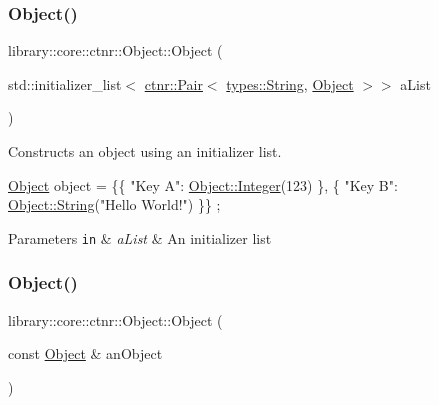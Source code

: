 \subsubsection{\texorpdfstring{Object()}{Object()}\hspace{0.1cm}{\footnotesize\ttfamily [2/3]}}
{\footnotesize\ttfamily library\+::core\+::ctnr\+::\+Object\+::\+Object (\begin{DoxyParamCaption}\item[{std\+::initializer\+\_\+list$<$ \hyperlink{namespacelibrary_1_1core_1_1ctnr_aad6f8de4c0f279c10436d59d4ace74bd}{ctnr\+::\+Pair}$<$ \hyperlink{classlibrary_1_1core_1_1types_1_1_string}{types\+::\+String}, \hyperlink{classlibrary_1_1core_1_1ctnr_1_1_object}{Object} $>$$>$}]{a\+List }\end{DoxyParamCaption})}



Constructs an object using an initializer list. 


\begin{DoxyCode}
\hyperlink{classlibrary_1_1core_1_1ctnr_1_1_object_a51bb72dec3a1b2738e0ad92b977b8d8d}{Object} \textcolor{keywordtype}{object} = \{\{ \textcolor{stringliteral}{"Key A"}: \hyperlink{classlibrary_1_1core_1_1ctnr_1_1_object_a8a8b1ef718d092c154011cf5c37373bb}{Object::Integer}(123) \}, \{ \textcolor{stringliteral}{"Key B"}: 
      \hyperlink{classlibrary_1_1core_1_1ctnr_1_1_object_a4f6eb8f93e1907ac91b6055c456f9ec3}{Object::String}(\textcolor{stringliteral}{"Hello World!"}) \}\} ;
\end{DoxyCode}



\begin{DoxyParams}[1]{Parameters}
\mbox{\tt in}  & {\em a\+List} & An initializer list \\
\hline
\end{DoxyParams}
\mbox{\label{classlibrary_1_1core_1_1ctnr_1_1_object_a90f9c4579306498a5da413ac89ac0109}} 
\subsubsection{\texorpdfstring{Object()}{Object()}\hspace{0.1cm}{\footnotesize\ttfamily [3/3]}}
{\footnotesize\ttfamily library\+::core\+::ctnr\+::\+Object\+::\+Object (\begin{DoxyParamCaption}\item[{const \hyperlink{classlibrary_1_1core_1_1ctnr_1_1_object}{Object} \&}]{an\+Object }\end{DoxyParamCaption})}



